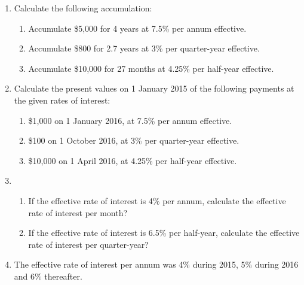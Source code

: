 \documentclass[
]{article}
\theoremstyle{definition}
\theoremstyle{definition}
\theoremstyle{definition}
\theoremstyle{definition}
\theoremstyle{remark}
\begin{document}
\begin{enumerate}
\def\labelenumi{\arabic{enumi}.}
\item
  Calculate the following accumulation:

  \begin{enumerate}
  \def\labelenumii{\arabic{enumii}.}
  \item
    Accumulate \$5,000 for 4 years at 7.5\% per annum effective.
  \item
    Accumulate \$800 for 2.7 years at 3\% per quarter-year effective.
  \item
    Accumulate \$10,000 for 27 months at 4.25\% per half-year
    effective.
  \end{enumerate}
\item
  Calculate the present values on 1 January 2015 of the following
  payments at the given rates of interest:

  \begin{enumerate}
  \def\labelenumii{\arabic{enumii}.}
  \item
    \$1,000 on 1 January 2016, at 7.5\% per annum effective.
  \item
    \$100 on 1 October 2016, at 3\% per quarter-year effective.
  \item
    \$10,000 on 1 April 2016, at 4.25\% per half-year effective.
  \end{enumerate}
\item
  \begin{enumerate}
  \def\labelenumii{\arabic{enumii}.}
  \item
    If the effective rate of interest is 4\% per annum, calculate the
    effective rate of interest per month?
  \item
    If the effective rate of interest is 6.5\% per half-year,
    calculate the effective rate of interest per quarter-year?
  \end{enumerate}
\item
  The effective rate of interest per annum was 4\% during 2015, 5\%
  during 2016 and 6\% thereafter.


\end{enumerate}
\end{document}
